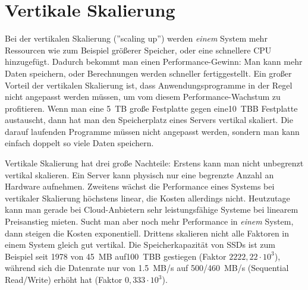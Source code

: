 \section{Vertikale Skalierung}
Bei der vertikalen Skalierung (''scaling up'') werden \textit{einem} System mehr Ressourcen wie zum Beispiel größerer Speicher, oder eine schnellere CPU hinzugefügt. Dadurch bekommt man einen Performance-Gewinn: Man kann mehr Daten speichern, oder Berechnungen werden schneller fertiggestellt. Ein großer Vorteil der vertikalen Skalierung ist, dass Anwendungsprogramme in der Regel nicht angepasst werden müssen, um vom diesem Performance-Wachstum zu profitieren. Wenn man eine 5 TB große Festplatte gegen eine10 TBB Festplatte austauscht, dann hat man den Speicherplatz eines Servers vertikal skaliert. Die darauf laufenden Programme müssen nicht angepasst werden, sondern man kann einfach doppelt so viele Daten speichern.\cite{beaumont_how_2014}
\par
Vertikale Skalierung hat drei große Nachteile: Erstens kann man nicht unbegrenzt vertikal skalieren. Ein Server kann physisch nur eine begrenzte Anzahl an Hardware aufnehmen. Zweitens wächst die Performance eines Systems bei vertikaler Skalierung höchstens linear\cite{gustafson_amdahls_2011}, die Kosten allerdings nicht\cite{noauthor_horizontal_nodate}. Heutzutage kann man gerade bei Cloud-Anbietern sehr leistungsfähige Systeme bei linearem Preisanstieg mieten.\cite{noauthor_pricing_nodate} Sucht man aber noch mehr Performance in \textit{einem} System, dann steigen die Kosten exponentiell\cite{athow_at_2020}. Drittens skalieren nicht alle Faktoren in einem System gleich gut vertikal. Die Speicherkapazität von SSDs ist zum Beispiel seit 1978 von 45 MB auf100 TBB gestiegen (Faktor $2222,22 \cdot 10^{3}$), während sich die Datenrate nur von 1.5 MB/s auf 500/460 MB/s (Sequential Read/Write) erhöht hat (Faktor $0,333 \cdot 10^{3}$).\cite{athow_at_2020}\cite{noauthor_who_nodate}  

